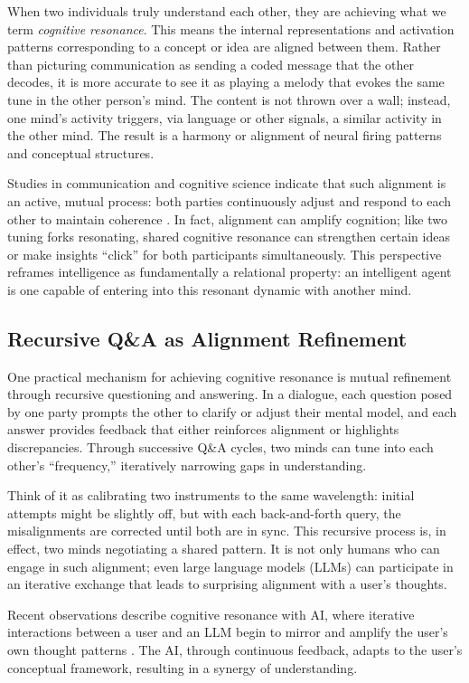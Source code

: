 \documentclass{article}
\begin{document}
When two individuals truly understand each other, they are achieving what we term \emph{cognitive resonance}. This means the internal representations and activation patterns corresponding to a concept or idea are aligned between them. Rather than picturing communication as sending a coded message that the other decodes, it is more accurate to see it as playing a melody that evokes the same tune in the other person's mind. The content is not thrown over a wall; instead, one mind's activity triggers, via language or other signals, a similar activity in the other mind. The result is a harmony or alignment of neural firing patterns and conceptual structures.

Studies in communication and cognitive science indicate that such alignment is an active, mutual process: both parties continuously adjust and respond to each other to maintain coherence \citep{stephens2010, rane2024}. In fact, alignment can amplify cognition; like two tuning forks resonating, shared cognitive resonance can strengthen certain ideas or make insights ``click'' for both participants simultaneously. This perspective reframes intelligence as fundamentally a relational property: an intelligent agent is one capable of entering into this resonant dynamic with another mind.

\subsection{Recursive Q\&A as Alignment Refinement}

One practical mechanism for achieving cognitive resonance is mutual refinement through recursive questioning and answering. In a dialogue, each question posed by one party prompts the other to clarify or adjust their mental model, and each answer provides feedback that either reinforces alignment or highlights discrepancies. Through successive Q\&A cycles, two minds can tune into each other's ``frequency,'' iteratively narrowing gaps in understanding.

Think of it as calibrating two instruments to the same wavelength: initial attempts might be slightly off, but with each back-and-forth query, the misalignments are corrected until both are in sync. This recursive process is, in effect, two minds negotiating a shared pattern. It is not only humans who can engage in such alignment; even large language models (LLMs) can participate in an iterative exchange that leads to surprising alignment with a user's thoughts.

Recent observations describe cognitive resonance with AI, where iterative interactions between a user and an LLM begin to mirror and amplify the user's own thought patterns \citep{psychology_today_cognitive}. The AI, through continuous feedback, adapts to the user's conceptual framework, resulting in a synergy of understanding.
\end{document}
